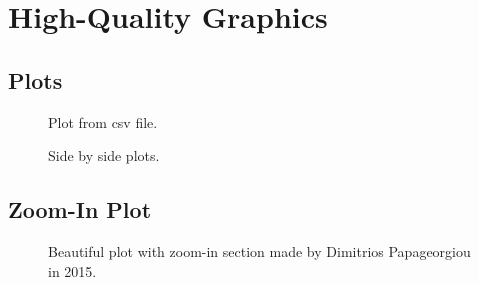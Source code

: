 \chapter{High-Quality Graphics}


\section{Plots}
\begin{figure}[htbp]
	\centering
	\def\figWidth{0.75\textwidth}
	
	\caption{Plot from csv file.}
	\label{fig:plot}
\end{figure}

\begin{figure}[htbp]
	\centering
	\caption{Side by side plots.}
	\label{fig:side_by_side_plots}
\end{figure}

\FloatBarrier
\section{Zoom-In Plot}
\begin{figure}[htbp]
	\centering
	
	\caption{Beautiful plot with zoom-in section made by Dimitrios Papageorgiou in 2015.}
	\label{fig:zoom_plot}
\end{figure}